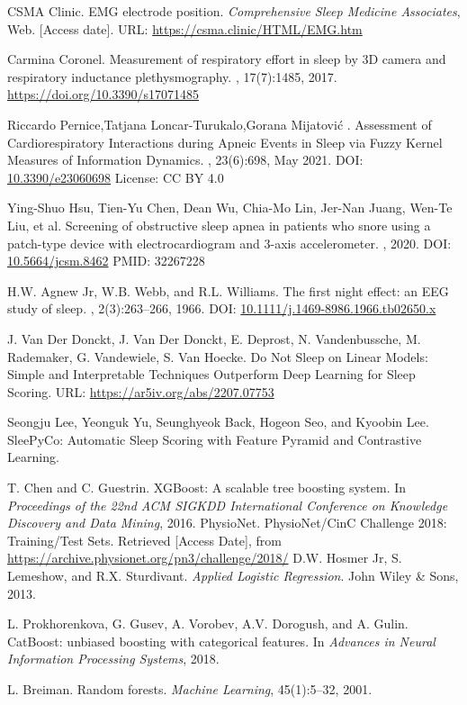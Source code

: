 \documentclass[12pt, a4paper,oneside]{book}
\numberwithin{equation}{section}
\begin{document}
\begin{thebibliography}{999}
CSMA Clinic.
\newblock EMG electrode position.
\newblock \textit{Comprehensive Sleep Medicine Associates}, 
\newblock Web. [Access date].
\newblock URL: \url{https://csma.clinic/HTML/EMG.htm}


Carmina Coronel.
\newblock Measurement of respiratory effort in sleep by 3D camera and respiratory inductance plethysmography.
, 17(7):1485, 2017.
\newblock \url{https://doi.org/10.3390/s17071485}

Riccardo Pernice,Tatjana Loncar-Turukalo,Gorana Mijatović
.
\newblock Assessment of Cardiorespiratory Interactions during Apneic Events in Sleep via Fuzzy Kernel Measures of Information Dynamics.
, 23(6):698, May 2021.
\newblock DOI: \url{10.3390/e23060698}
\newblock License: CC BY 4.0

Ying-Shuo Hsu, Tien-Yu Chen, Dean Wu, Chia-Mo Lin, Jer-Nan Juang, Wen-Te Liu, et al.
\newblock Screening of obstructive sleep apnea in patients who snore using a patch-type device with electrocardiogram and 3-axis accelerometer.
, 2020.
\newblock DOI: \url{10.5664/jcsm.8462}
\newblock PMID: 32267228

H.W. Agnew Jr, W.B. Webb, and R.L. Williams.
\newblock The first night effect: an EEG study of sleep.
, 2(3):263--266, 1966.
\newblock DOI: \url{10.1111/j.1469-8986.1966.tb02650.x}

J. Van Der Donckt, J. Van Der Donckt, E. Deprost, N. Vandenbussche, M. Rademaker, G. Vandewiele, S. Van Hoecke.
\newblock Do Not Sleep on Linear Models: Simple and Interpretable Techniques Outperform Deep Learning for Sleep Scoring.
\newblock URL: \url{https://ar5iv.org/abs/2207.07753}

Seongju Lee, Yeonguk Yu, Seunghyeok Back, Hogeon Seo, and Kyoobin Lee.
\newblock SleePyCo: Automatic Sleep Scoring with Feature Pyramid and Contrastive Learning.

T. Chen and C. Guestrin.
\newblock XGBoost: A scalable tree boosting system.
\newblock In \textit{Proceedings of the 22nd ACM SIGKDD International Conference on Knowledge Discovery and Data Mining}, 2016.
PhysioNet.
\newblock PhysioNet/CinC Challenge 2018: Training/Test Sets.
\newblock Retrieved [Access Date], from \url{https://archive.physionet.org/pn3/challenge/2018/}
D.W. Hosmer Jr, S. Lemeshow, and R.X. Sturdivant.
\newblock \textit{Applied Logistic Regression}.
\newblock John Wiley \& Sons, 2013.

L. Prokhorenkova, G. Gusev, A. Vorobev, A.V. Dorogush, and A. Gulin.
\newblock CatBoost: unbiased boosting with categorical features.
\newblock In \textit{Advances in Neural Information Processing Systems}, 2018.


L. Breiman.
\newblock Random forests.
\newblock \textit{Machine Learning}, 45(1):5--32, 2001.


\end{thebibliography}
\end{document}
